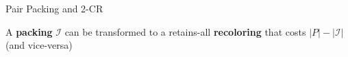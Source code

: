 \begin{frame}{Pair Packing and 2-CR}

\begin{observation}
A \textbf{packing} $\mathcal{I}$ can be transformed to a retains-all \textbf{recoloring} that costs 
$|P| - |\mathcal{I}|$ {\small(and vice-versa)}
\end{observation}

\end{frame}
